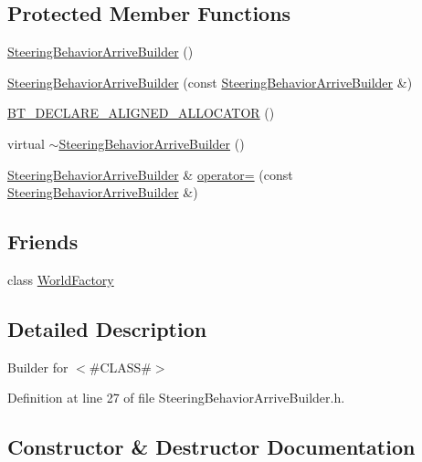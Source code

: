 \subsection*{Protected Member Functions}
\begin{DoxyCompactItemize}
\item 
\mbox{\hyperlink{classnjli_1_1_steering_behavior_arrive_builder_af63ec3a00832887a1110281740f19e0b}{Steering\+Behavior\+Arrive\+Builder}} ()
\item 
\mbox{\hyperlink{classnjli_1_1_steering_behavior_arrive_builder_a1095c6b315af832d6af5bd757616f194}{Steering\+Behavior\+Arrive\+Builder}} (const \mbox{\hyperlink{classnjli_1_1_steering_behavior_arrive_builder}{Steering\+Behavior\+Arrive\+Builder}} \&)
\item 
\mbox{\hyperlink{classnjli_1_1_steering_behavior_arrive_builder_a4d871dd950ccc30c600bf85fba8bf49b}{B\+T\+\_\+\+D\+E\+C\+L\+A\+R\+E\+\_\+\+A\+L\+I\+G\+N\+E\+D\+\_\+\+A\+L\+L\+O\+C\+A\+T\+OR}} ()
\item 
virtual \mbox{\hyperlink{classnjli_1_1_steering_behavior_arrive_builder_ac6c756f66dade352e2724c88b56baa44}{$\sim$\+Steering\+Behavior\+Arrive\+Builder}} ()
\item 
\mbox{\hyperlink{classnjli_1_1_steering_behavior_arrive_builder}{Steering\+Behavior\+Arrive\+Builder}} \& \mbox{\hyperlink{classnjli_1_1_steering_behavior_arrive_builder_a5978575c7c49a72371b2b945d5794377}{operator=}} (const \mbox{\hyperlink{classnjli_1_1_steering_behavior_arrive_builder}{Steering\+Behavior\+Arrive\+Builder}} \&)
\end{DoxyCompactItemize}
\subsection*{Friends}
\begin{DoxyCompactItemize}
\item 
class \mbox{\hyperlink{classnjli_1_1_steering_behavior_arrive_builder_acb96ebb09abe8f2a37a915a842babfac}{World\+Factory}}
\end{DoxyCompactItemize}


\subsection{Detailed Description}
Builder for $<$\#\+C\+L\+A\+SS\#$>$ 

Definition at line 27 of file Steering\+Behavior\+Arrive\+Builder.\+h.



\subsection{Constructor \& Destructor Documentation}
\mbox{\label{classnjli_1_1_steering_behavior_arrive_builder_af63ec3a00832887a1110281740f19e0b}} 
